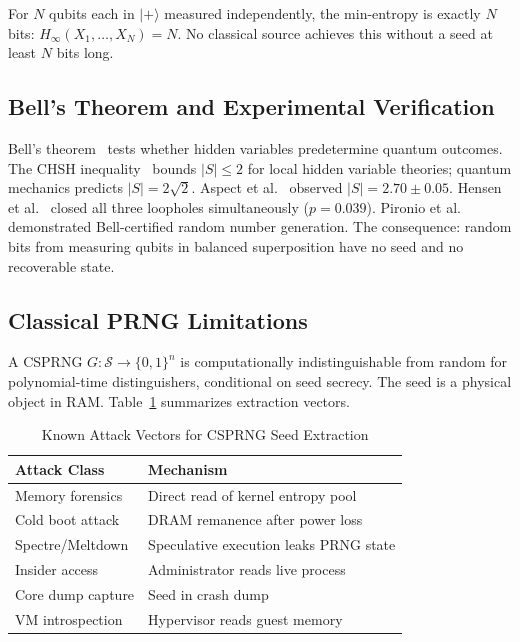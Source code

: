 \documentclass[acmsmall,screen,review,anonymous]{acmart}
\begin{document}
For $N$ qubits each in $|{+}\rangle$ measured independently, the min-entropy is exactly $N$ bits: $H_\infty(X_1, \ldots, X_N) = N$. No classical source achieves this without a seed at least $N$ bits long.

\subsection{Bell's Theorem and Experimental Verification}

Bell's theorem~\cite{bell1964epr} tests whether hidden variables predetermine quantum outcomes. The CHSH inequality~\cite{clauser1969chsh} bounds $|S| \leq 2$ for local hidden variable theories; quantum mechanics predicts $|S| = 2\sqrt{2}$. Aspect et al.~\cite{aspect1982epr} observed $|S| = 2.70 \pm 0.05$. Hensen et al.~\cite{hensen2015loophole} closed all three loopholes simultaneously ($p = 0.039$). Pironio et al.~\cite{pironio2010certified} demonstrated Bell-certified random number generation. The consequence: random bits from measuring qubits in balanced superposition have no seed and no recoverable state.

\subsection{Classical PRNG Limitations}

A CSPRNG $G\colon \mathcal{S} \to \{0,1\}^n$ is computationally indistinguishable from random for polynomial-time distinguishers, conditional on seed secrecy. The seed is a physical object in RAM. Table~\ref{tab:prng_attacks} summarizes extraction vectors.

\begin{table}[t]
\caption{Known Attack Vectors for CSPRNG Seed Extraction}
\label{tab:prng_attacks}
\begin{center}
\begin{tabular}{@{}lp{5cm}@{}}
\toprule
\textbf{Attack Class} & \textbf{Mechanism} \\
\midrule
Memory forensics & Direct read of kernel entropy pool \\
Cold boot attack & DRAM remanence after power loss \\
Spectre/Meltdown & Speculative execution leaks PRNG state \\
Insider access & Administrator reads live process \\
Core dump capture & Seed in crash dump \\
VM introspection & Hypervisor reads guest memory \\
\bottomrule
\end{tabular}
\end{center}
\end{table}
\end{document}
